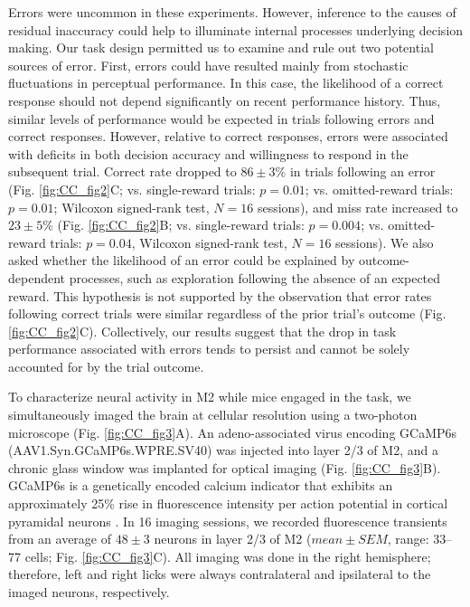 Errors were uncommon in these experiments. However, inference to the causes of residual inaccuracy could help to illuminate internal processes underlying decision making. Our task design permitted us to examine and rule out two potential sources of error. First, errors could have resulted mainly from stochastic fluctuations in perceptual performance. In this case, the likelihood of a correct response should not depend significantly on recent performance history. Thus, similar levels of performance would be expected in trials following errors and correct responses. However, relative to correct responses, errors were associated with deficits in both decision accuracy and willingness to respond in the subsequent trial. Correct rate dropped to $86 \pm 3\%$ in trials following an error (Fig. \ref{fig:CC_fig2}C; vs. single-reward trials: $p = 0.01$; vs. omitted-reward trials: $p = 0.01$; Wilcoxon signed-rank test, $N = 16$ sessions), and miss rate increased to $23 \pm 5\%$ (Fig. \ref{fig:CC_fig2}B; vs. single-reward trials: $p = 0.004$; vs. omitted-reward trials: $p = 0.04$, Wilcoxon signed-rank test, $N = 16$ sessions). We also asked whether the likelihood of an error could be explained by outcome-dependent processes, such as exploration following the absence of an expected reward. This hypothesis is not supported by the observation that error rates following correct trials were similar regardless of the prior trial’s outcome (Fig. \ref{fig:CC_fig2}C). Collectively, our results suggest that the drop in task performance associated with errors tends to persist and cannot be solely accounted for by the trial outcome.

To characterize neural activity in M2 while mice engaged in the task, we simultaneously imaged the brain at cellular resolution using a two-photon microscope \citep{denk1990two} (Fig. \ref{fig:CC_fig3}A). An adeno-associated virus encoding GCaMP6s (AAV1.Syn.GCaMP6s.WPRE.SV40) was injected into layer 2/3 of M2, and a chronic glass window was implanted for optical imaging (Fig. \ref{fig:CC_fig3}B). GCaMP6s is a genetically encoded calcium indicator that exhibits an approximately 25\% rise in fluorescence intensity per action potential in cortical pyramidal neurons \citep{chen2013ultrasensitive}. In 16 imaging sessions, we recorded fluorescence transients from an average of $48 \pm 3$ neurons in layer 2/3 of M2 ($\mathit{mean}\pm\mathit{SEM}$, range: 33–77 cells; Fig. \ref{fig:CC_fig3}C). All imaging was done in the right hemisphere; therefore, left and right licks were always contralateral and ipsilateral to the imaged neurons, respectively.

